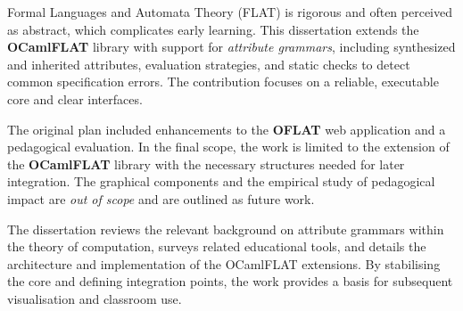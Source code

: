 
%

Formal Languages and Automata Theory (FLAT) is rigorous and often perceived as abstract, which complicates early learning. This dissertation extends 
the \textbf{OCamlFLAT} library with support for \emph{attribute grammars}, including synthesized and inherited attributes, evaluation strategies, and 
static checks to detect common specification errors. The contribution focuses on a reliable, executable core and clear interfaces.

The original plan included enhancements to the \textbf{OFLAT} web application and a pedagogical evaluation. In the final scope, the work is limited to 
the extension of the \textbf{OCamlFLAT} library with the necessary structures needed for later integration. The graphical components and the empirical study of pedagogical 
impact are \emph{out of scope} and are outlined as future work.

The dissertation reviews the relevant background on attribute grammars within the theory of computation, surveys related educational tools, 
and details the architecture and implementation of the OCamlFLAT extensions. By stabilising the core and defining integration points, the work 
provides a basis for subsequent visualisation and classroom use.


